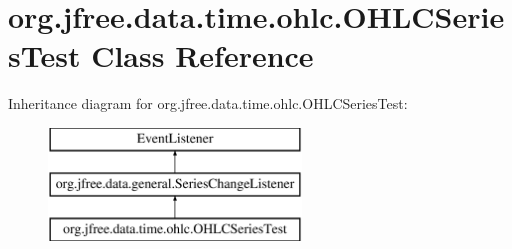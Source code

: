 \hypertarget{classorg_1_1jfree_1_1data_1_1time_1_1ohlc_1_1_o_h_l_c_series_test}{}\section{org.\+jfree.\+data.\+time.\+ohlc.\+O\+H\+L\+C\+Series\+Test Class Reference}
\label{classorg_1_1jfree_1_1data_1_1time_1_1ohlc_1_1_o_h_l_c_series_test}
Inheritance diagram for org.\+jfree.\+data.\+time.\+ohlc.\+O\+H\+L\+C\+Series\+Test\+:\begin{figure}[H]
\begin{center}
\leavevmode
\includegraphics[height=3.000000cm]{classorg_1_1jfree_1_1data_1_1time_1_1ohlc_1_1_o_h_l_c_series_test}
\end{center}
\end{figure}
